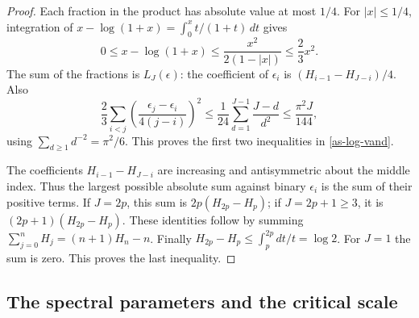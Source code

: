 \begin{proof}
Each fraction in the product has absolute value at most $1/4$.
For $|x|\leq1/4$, integration of
$x-\log(1+x)=\int_0^x t/(1+t)\,dt$ gives
\[
 0\leq x-\log(1+x)\leq\frac{x^2}{2(1-|x|)}
                                      \leq\frac23x^2.
\]
The sum of the fractions is $L_J(\epsilon)$: the coefficient
of $\epsilon_i$ is $(H_{i-1}-H_{J-i})/4$.
Also
\[
 \frac23\sum_{i<j}
       \left(\frac{\epsilon_j-\epsilon_i}{4(j-i)}\right)^2
 \leq\frac1{24}\sum_{d=1}^{J-1}\frac{J-d}{d^2}
 \leq\frac{\pi^2J}{144},
\]
using $\sum_{d\geq1}d^{-2}=\pi^2/6$.
This proves the first two inequalities in \eqref{as-log-vand}.

The coefficients $H_{i-1}-H_{J-i}$ are increasing and
antisymmetric about the middle index.  Thus the largest possible
absolute sum against binary $\epsilon_i$ is the sum of their
positive terms.  If $J=2p$, this sum is
$2p(H_{2p}-H_p)$; if $J=2p+1\geq3$, it is
$(2p+1)(H_{2p}-H_p)$.  These identities follow by summing
$\sum_{j=0}^nH_j=(n+1)H_n-n$.
Finally
$H_{2p}-H_p\leq\int_p^{2p}dt/t=\log2$.
For $J=1$ the sum is zero.  This proves the last inequality.
\end{proof}

\subsection{The spectral parameters and the critical scale}

